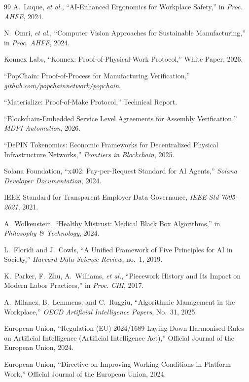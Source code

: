 \documentclass[10pt,twocolumn]{article}
\begin{document}
\begin{thebibliography}{99}
A.~Luque, \emph{et al.},
``AI-Enhanced Ergonomics for Workplace Safety,''
in \emph{Proc. AHFE}, 2024.

N.~Omri, \emph{et al.},
``Computer Vision Approaches for Sustainable Manufacturing,''
in \emph{Proc. AHFE}, 2024.

Konnex Labs,
``Konnex: Proof-of-Physical-Work Protocol,''
White Paper, 2026.

``PopChain: Proof-of-Process for Manufacturing Verification,''
\emph{github.com/popchainnetwork/popchain}.

``Materialize: Proof-of-Make Protocol,''
Technical Report.

``Blockchain-Embedded Service Level Agreements for Assembly Verification,''
\emph{MDPI Automation}, 2026.

``DePIN Tokenomics: Economic Frameworks for Decentralized Physical Infrastructure Networks,''
\emph{Frontiers in Blockchain}, 2025.

Solana Foundation,
``x402: Pay-per-Request Standard for AI Agents,''
\emph{Solana Developer Documentation}, 2024.

IEEE Standard for Transparent Employer Data Governance,
\emph{IEEE Std 7005-2021}, 2021.

A.~Wolkenstein,
``Healthy Mistrust: Medical Black Box Algorithms,''
in \emph{Philosophy \& Technology}, 2024.

L.~Floridi and J.~Cowls,
``A Unified Framework of Five Principles for AI in Society,''
\emph{Harvard Data Science Review}, no.~1, 2019.

K.~Parker, F.~Zhu, A.~Williams, \emph{et al.},
``Piecework History and Its Impact on Modern Labor Practices,''
in \emph{Proc. CHI}, 2017.

A.~Milanez, B.~Lemmens, and C.~Ruggiu,
``Algorithmic Management in the Workplace,''
\emph{OECD Artificial Intelligence Papers}, No.~31, 2025.

European Union,
``Regulation (EU) 2024/1689 Laying Down Harmonised Rules on Artificial Intelligence (Artificial Intelligence Act),''
Official Journal of the European Union, 2024.

European Union,
``Directive on Improving Working Conditions in Platform Work,''
Official Journal of the European Union, 2024.


\end{thebibliography}
\end{document}
